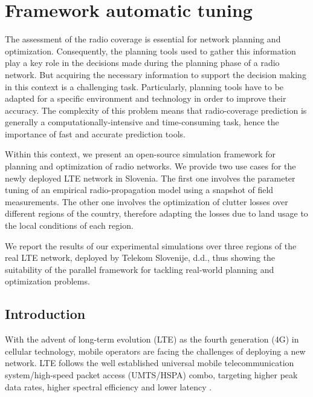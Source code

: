 
\chapter{Framework automatic tuning \label{chap:Framework-parameter-tuning}}


The assessment of the radio coverage is essential for network planning
and optimization. Consequently, the planning tools used to gather
this information play a key role in the decisions made during the
planning phase of a radio network. But acquiring the necessary information
to support the decision making in this context is a challenging task.
Particularly, planning tools have to be adapted for a specific environment
and technology in order to improve their accuracy. The complexity
of this problem means that radio-coverage prediction is generally
a computationally-intensive and time-consuming task, hence the importance
of fast and accurate prediction tools.

Within this context, we present an open-source simulation framework
for planning and optimization of radio networks. We provide two use
cases for the newly deployed LTE network in Slovenia. The first one
involves the parameter tuning of an empirical radio-propagation model
using a snapshot of field measurements. The other one involves the
optimization of clutter losses over different regions of the country,
therefore adapting the losses due to land usage to the local conditions
of each region.

We report the results of our experimental simulations over three regions
of the real LTE network, deployed by Telekom Slovenije, d.d., thus
showing the suitability of the parallel framework for tackling real-world
planning and optimization problems.


\section{Introduction}

With the advent of long-term evolution (LTE) as the fourth generation
(4G) in cellular technology, mobile operators are facing the challenges
of deploying a new network. LTE follows the well established universal
mobile telecommunication system/high-speed packet access (UMTS/HSPA)
combo, targeting higher peak data rates, higher spectral efficiency
and lower latency \cite{Song_Evolved_cellular_network_planning_and_optimization_for_UMTS_and_LTE:2010}. 

